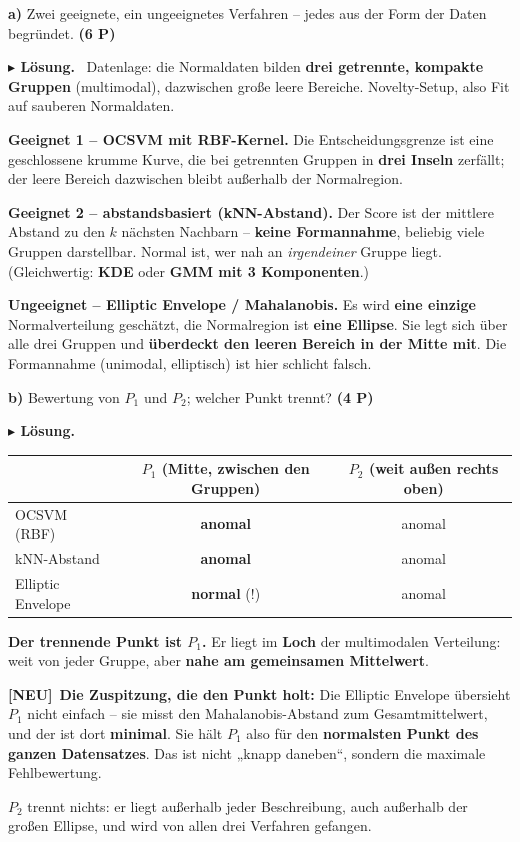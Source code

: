 \documentclass[10pt,a4paper]{article}
\newcommand{\pkt}[1]{\hfill\textbf{(#1 P)}}
\newcommand{\neu}{{\color{neurot}\footnotesize\bfseries[NEU]}\ }
\newenvironment{loes}%
  {\par\vspace{2pt}\begingroup\small\noindent\textbf{\color{loesfarbe}$\blacktriangleright$ Lösung.}\ }%
  {\endgroup\par\vspace{5pt}}
\begin{document}
\textbf{a)} Zwei geeignete, ein ungeeignetes Verfahren -- jedes aus der Form der Daten begründet. \pkt{6}

\begin{loes}
Datenlage: die Normaldaten bilden \textbf{drei getrennte, kompakte Gruppen} (multimodal), dazwischen
große leere Bereiche. Novelty-Setup, also Fit auf sauberen Normaldaten.

\textbf{Geeignet 1 -- OCSVM mit RBF-Kernel.} Die Entscheidungsgrenze ist eine geschlossene krumme
Kurve, die bei getrennten Gruppen in \textbf{drei Inseln} zerfällt; der leere Bereich dazwischen
bleibt außerhalb der Normalregion.

\textbf{Geeignet 2 -- abstandsbasiert (kNN-Abstand).} Der Score ist der mittlere Abstand zu den $k$
nächsten Nachbarn -- \textbf{keine Formannahme}, beliebig viele Gruppen darstellbar. Normal ist,
wer nah an \emph{irgendeiner} Gruppe liegt. (Gleichwertig: \textbf{KDE} oder \textbf{GMM mit 3
Komponenten}.)

\textbf{Ungeeignet -- Elliptic Envelope / Mahalanobis.} Es wird \textbf{eine einzige}
Normalverteilung geschätzt, die Normalregion ist \textbf{eine Ellipse}. Sie legt sich über alle
drei Gruppen und \textbf{überdeckt den leeren Bereich in der Mitte mit}. Die Formannahme
(unimodal, elliptisch) ist hier schlicht falsch.
\end{loes}

\textbf{b)} Bewertung von $P_1$ und $P_2$; welcher Punkt trennt? \pkt{4}

\begin{loes}
\begin{center}\small
\begin{tabular}{|l|c|c|}
\hline
& $P_1$ (Mitte, zwischen den Gruppen) & $P_2$ (weit außen rechts oben)\\ \hline
OCSVM (RBF) & \textbf{anomal} & anomal\\ \hline
kNN-Abstand & \textbf{anomal} & anomal\\ \hline
Elliptic Envelope & \textbf{normal} (!) & anomal\\ \hline
\end{tabular}
\end{center}
\textbf{Der trennende Punkt ist $P_1$.} Er liegt im \textbf{Loch} der multimodalen Verteilung: weit
von jeder Gruppe, aber \textbf{nahe am gemeinsamen Mittelwert}.

\neu \textbf{Die Zuspitzung, die den Punkt holt:} Die Elliptic Envelope übersieht $P_1$ nicht
einfach -- sie misst den Mahalanobis-Abstand zum Gesamtmittelwert, und der ist dort
\textbf{minimal}. Sie hält $P_1$ also für den \textbf{normalsten Punkt des ganzen Datensatzes}.
Das ist nicht „knapp daneben``, sondern die maximale Fehlbewertung.

$P_2$ trennt nichts: er liegt außerhalb jeder Beschreibung, auch außerhalb der großen Ellipse, und
wird von allen drei Verfahren gefangen.
\end{loes}
\end{document}
